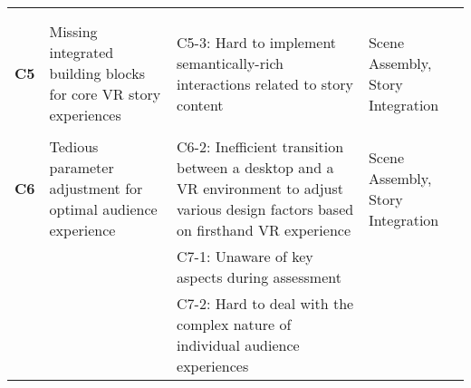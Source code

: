 \begin{table*}
\begin{tabular}{@{}lp{5.1cm}m{7.6cm}p{3.2cm}@{}}
             &    & \cellcolor[HTML]{edf5f7}{C5-1: Hard to plan and coordinate various story elements spatially and temporally}                                                                     &                               \\ %
                                &                                                                                     & \cellcolor[HTML]{edf5f7}{C5-2: Hard to switch between multiple narrative perspectives without confusing viewers about their roles}                                                                                     &                                                                                         \\ %
                                \multirow{-4.5}{*}{\textbf{C5}} &   \multirow{-4.5}{*}{\parbox{4.5cm}{Missing integrated building blocks for core VR story experiences}}                                                                               &  {C5-3: Hard to implement semantically-rich interactions related to story content}                                                                                     &     \multirow{-4.5}{*}{\parbox{2.5cm}{Scene Assembly, Story Integration}}                                                                                          \\ \hline
            &      & \cellcolor[HTML]{edf5f7}{C6-1: Uncertainty in the relationships between various design parameters,  emotions, and viewer comfort}                                 &                                   \\ %
                         \multirow{-3}{*}{\textbf{C6}}        &      \multirow{-3}{*}{\parbox{4.5cm}{Tedious parameter adjustment for optimal audience experience}}                                                                               &  {C6-2: Inefficient transition between a desktop and a VR environment to adjust various design factors based on firsthand VR experience}                                                         &    \multirow{-3}{*}{\parbox{2.5cm}{Scene Assembly, Story Integration}}        \\ \hline
                                      &    &  {C7-1: Unaware of key aspects during assessment}                                                                 &                               \\ %
                                &                                                                                     &  {C7-2: Hard to deal with the complex nature of individual audience experiences}                                                                                     &                                                                                         \\ %

\end{tabular}
\end{table*}
